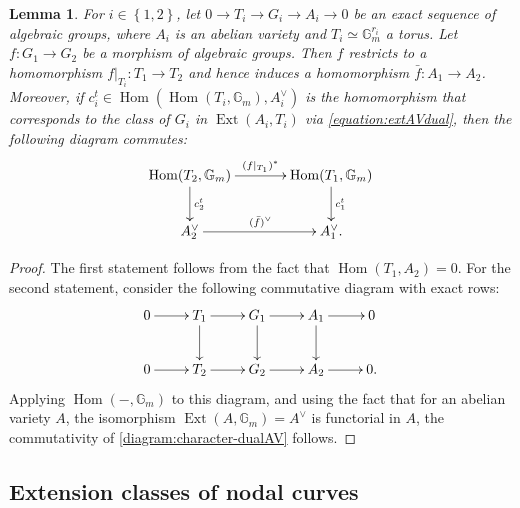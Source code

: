 \documentclass[a4paper,11pt,reqno]{amsart}
\numberwithin{equation}{section}
\theoremstyle{plain}
\newtheorem{lemma}[theorem]{Lemma}
\theoremstyle{definition}
\newcommand{\G}{\mathbb G}
\newcommand{\Hom}{\operatorname{Hom}}
\newcommand{\Ext}{\operatorname{Ext}}
\renewcommand{\cong}{\simeq}
\newcommand{\set}[1]{\left\{ #1 \right\}}
\begin{document}
\begin{lemma} \label{lemma:extension-class-commutativity}
For $i \in \set{1,2}$, let $0 \to T_i \to G_i \to A_i \to 0$ be an exact sequence of algebraic groups, where $A_i$ is an abelian variety and $T_i\cong \G_m^{r_i}$ a torus. 
Let $f \colon G_1 \to G_2$ be a morphism of algebraic groups. 
Then $f$ restricts to a homomorphism $f|_{T_i} \colon T_1 \to T_2$ and hence induces a homomorphism $\bar f \colon A_1 \to A_2$. 
Moreover, if $c^t_i \in \Hom(\Hom(T_i,\G_m), A^\vee_i)$ is the homomorphism that corresponds to the class of $G_i$ in $\Ext(A_i,T_i)$ via \eqref{equation:extAVdual}, then the following diagram commutes:
\begin{align}\label{diagram:character-dualAV}
\begin{split}
\xymatrixcolsep{3pc}
\xymatrix{
\Hom(T_2,\G_m) \ar[d]^{c^t_2} \ar[r]^{(f|_{T_1})^\ast} & \Hom(T_1,\G_m) \ar[d]^{c^t_1} \\
A_2^\vee \ar[r]^{(\bar f)^\vee} & A_1^\vee. 
}
\end{split}
\end{align}
\end{lemma}
\begin{proof}
The first statement follows from the fact that $\Hom(T_1,A_2) = 0$. For the second statement, consider the following commutative diagram with exact rows:
    \[
    \xymatrix{
    0 \ar[r] & T_1 \ar[r] \ar[d] & G_1 \ar[r] \ar[d] & A_1 \ar[d]\ar[r] & 0 \\
    0 \ar[r] & T_2 \ar[r] & G_2 \ar[r] & A_2 \ar[r] & 0.
    }
    \]
Applying $\Hom(-,\G_m)$ to this diagram, and using the fact that for an abelian variety $A$, the isomorphism $\Ext(A,\G_m) = A^\vee$ is functorial in $A$, the commutativity of \eqref{diagram:character-dualAV} follows. 
\end{proof}

\subsection{Extension classes of nodal curves} \label{subsection:extensionclassesofnodalcurves}
\end{document}
